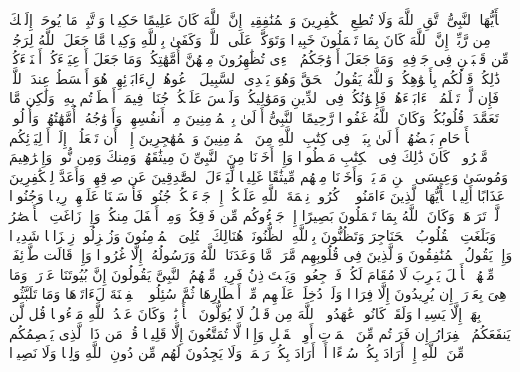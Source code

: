 یَٰۤأَیُّهَا ٱلنَّبِیُّ ٱتَّقِ ٱللَّهَ وَلَا تُطِعِ ٱلۡكَٰفِرِینَ وَٱلۡمُنَٰفِقِینَۚ إِنَّ ٱللَّهَ كَانَ عَلِیمًا حَكِیمࣰا%
\stopbuffer%
\startbuffer[\q:33:2]
وَٱتَّبِعۡ مَا یُوحَىٰۤ إِلَیۡكَ مِن رَّبِّكَۚ إِنَّ ٱللَّهَ كَانَ بِمَا تَعۡمَلُونَ خَبِیرࣰا%
\stopbuffer%
\startbuffer[\q:33:3]
وَتَوَكَّلۡ عَلَى ٱللَّهِۚ وَكَفَىٰ بِٱللَّهِ وَكِیلࣰا%
\stopbuffer%
\startbuffer[\q:33:4]
مَّا جَعَلَ ٱللَّهُ لِرَجُلࣲ مِّن قَلۡبَیۡنِ فِی جَوۡفِهِۦۚ وَمَا جَعَلَ أَزۡوَٰجَكُمُ ٱلَّٰۤءِی تُظَٰهِرُونَ مِنۡهُنَّ أُمَّهَٰتِكُمۡۚ وَمَا جَعَلَ أَدۡعِیَاۤءَكُمۡ أَبۡنَاۤءَكُمۡۚ ذَٰلِكُمۡ قَوۡلُكُم بِأَفۡوَٰهِكُمۡۖ وَٱللَّهُ یَقُولُ ٱلۡحَقَّ وَهُوَ یَهۡدِی ٱلسَّبِیلَ%
\stopbuffer%
\startbuffer[\q:33:5]
ٱدۡعُوهُمۡ لِءَابَاۤئِهِمۡ هُوَ أَقۡسَطُ عِندَ ٱللَّهِۚ فَإِن لَّمۡ تَعۡلَمُوۤا۟ ءَابَاۤءَهُمۡ فَإِخۡوَٰنُكُمۡ فِی ٱلدِّینِ وَمَوَٰلِیكُمۡۚ وَلَیۡسَ عَلَیۡكُمۡ جُنَاحࣱ فِیمَاۤ أَخۡطَأۡتُم بِهِۦ وَلَٰكِن مَّا تَعَمَّدَتۡ قُلُوبُكُمۡۚ وَكَانَ ٱللَّهُ غَفُورࣰا رَّحِیمًا%
\stopbuffer%
\startbuffer[\q:33:6]
ٱلنَّبِیُّ أَوۡلَىٰ بِٱلۡمُؤۡمِنِینَ مِنۡ أَنفُسِهِمۡۖ وَأَزۡوَٰجُهُۥۤ أُمَّهَٰتُهُمۡۗ وَأُو۟لُوا۟ ٱلۡأَرۡحَامِ بَعۡضُهُمۡ أَوۡلَىٰ بِبَعۡضࣲ فِی كِتَٰبِ ٱللَّهِ مِنَ ٱلۡمُؤۡمِنِینَ وَٱلۡمُهَٰجِرِینَ إِلَّاۤ أَن تَفۡعَلُوۤا۟ إِلَىٰۤ أَوۡلِیَاۤئِكُم مَّعۡرُوفࣰاۚ كَانَ ذَٰلِكَ فِی ٱلۡكِتَٰبِ مَسۡطُورࣰا%
\stopbuffer%
\startbuffer[\q:33:7]
وَإِذۡ أَخَذۡنَا مِنَ ٱلنَّبِیِّۦنَ مِیثَٰقَهُمۡ وَمِنكَ وَمِن نُّوحࣲ وَإِبۡرَٰهِیمَ وَمُوسَىٰ وَعِیسَى ٱبۡنِ مَرۡیَمَۖ وَأَخَذۡنَا مِنۡهُم مِّیثَٰقًا غَلِیظࣰا%
\stopbuffer%
\startbuffer[\q:33:8]
لِّیَسۡءَلَ ٱلصَّٰدِقِینَ عَن صِدۡقِهِمۡۚ وَأَعَدَّ لِلۡكَٰفِرِینَ عَذَابًا أَلِیمࣰا%
\stopbuffer%
\startbuffer[\q:33:9]
یَٰۤأَیُّهَا ٱلَّذِینَ ءَامَنُوا۟ ٱذۡكُرُوا۟ نِعۡمَةَ ٱللَّهِ عَلَیۡكُمۡ إِذۡ جَاۤءَتۡكُمۡ جُنُودࣱ فَأَرۡسَلۡنَا عَلَیۡهِمۡ رِیحࣰا وَجُنُودࣰا لَّمۡ تَرَوۡهَاۚ وَكَانَ ٱللَّهُ بِمَا تَعۡمَلُونَ بَصِیرًا%
\stopbuffer%
\startbuffer[\q:33:10]
إِذۡ جَاۤءُوكُم مِّن فَوۡقِكُمۡ وَمِنۡ أَسۡفَلَ مِنكُمۡ وَإِذۡ زَاغَتِ ٱلۡأَبۡصَٰرُ وَبَلَغَتِ ٱلۡقُلُوبُ ٱلۡحَنَاجِرَ وَتَظُنُّونَ بِٱللَّهِ ٱلظُّنُونَا۠%
\stopbuffer%
\startbuffer[\q:33:11]
هُنَالِكَ ٱبۡتُلِیَ ٱلۡمُؤۡمِنُونَ وَزُلۡزِلُوا۟ زِلۡزَالࣰا شَدِیدࣰا%
\stopbuffer%
\startbuffer[\q:33:12]
وَإِذۡ یَقُولُ ٱلۡمُنَٰفِقُونَ وَٱلَّذِینَ فِی قُلُوبِهِم مَّرَضࣱ مَّا وَعَدَنَا ٱللَّهُ وَرَسُولُهُۥۤ إِلَّا غُرُورࣰا%
\stopbuffer%
\startbuffer[\q:33:13]
وَإِذۡ قَالَت طَّاۤئِفَةࣱ مِّنۡهُمۡ یَٰۤأَهۡلَ یَثۡرِبَ لَا مُقَامَ لَكُمۡ فَٱرۡجِعُوا۟ۚ وَیَسۡتَءۡذِنُ فَرِیقࣱ مِّنۡهُمُ ٱلنَّبِیَّ یَقُولُونَ إِنَّ بُیُوتَنَا عَوۡرَةࣱ وَمَا هِیَ بِعَوۡرَةٍۖ إِن یُرِیدُونَ إِلَّا فِرَارࣰا%
\stopbuffer%
\startbuffer[\q:33:14]
وَلَوۡ دُخِلَتۡ عَلَیۡهِم مِّنۡ أَقۡطَارِهَا ثُمَّ سُئِلُوا۟ ٱلۡفِتۡنَةَ لَءَاتَوۡهَا وَمَا تَلَبَّثُوا۟ بِهَاۤ إِلَّا یَسِیرࣰا%
\stopbuffer%
\startbuffer[\q:33:15]
وَلَقَدۡ كَانُوا۟ عَٰهَدُوا۟ ٱللَّهَ مِن قَبۡلُ لَا یُوَلُّونَ ٱلۡأَدۡبَٰرَۚ وَكَانَ عَهۡدُ ٱللَّهِ مَسۡءُولࣰا%
\stopbuffer%
\startbuffer[\q:33:16]
قُل لَّن یَنفَعَكُمُ ٱلۡفِرَارُ إِن فَرَرۡتُم مِّنَ ٱلۡمَوۡتِ أَوِ ٱلۡقَتۡلِ وَإِذࣰا لَّا تُمَتَّعُونَ إِلَّا قَلِیلࣰا%
\stopbuffer%
\startbuffer[\q:33:17]
قُلۡ مَن ذَا ٱلَّذِی یَعۡصِمُكُم مِّنَ ٱللَّهِ إِنۡ أَرَادَ بِكُمۡ سُوۤءًا أَوۡ أَرَادَ بِكُمۡ رَحۡمَةࣰۚ وَلَا یَجِدُونَ لَهُم مِّن دُونِ ٱللَّهِ وَلِیࣰّا وَلَا نَصِیرࣰا%
\stopbuffer%
